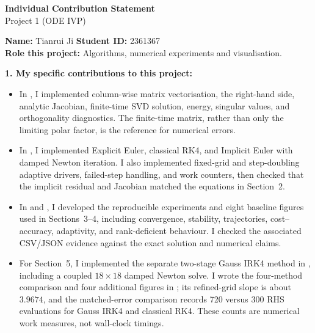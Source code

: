 \documentclass[11pt,a4paper]{article}
\begin{document}
\begin{center}
    {\Large\bfseries Individual Contribution Statement}\\[0.3em]
    {\large Project 1 (ODE IVP)}
\end{center}

\begin{formbox}
\small
\textbf{Name:} Tianrui Ji \hfill \textbf{Student ID:} 2361367\\
\textbf{Role this project:} Algorithms, numerical experiments and visualisation.

\textbf{1. My specific contributions to this project:}

\begin{itemize}[leftmargin=1.4em,itemsep=1pt,topsep=2pt]
    \item In , I implemented column-wise matrix
    vectorisation, the right-hand side, analytic Jacobian, finite-time SVD
    solution, energy, singular values, and orthogonality diagnostics. The
    finite-time matrix, rather than only the limiting polar factor, is the
    reference for numerical errors.
    \item In , I implemented Explicit Euler,
    classical RK4, and Implicit Euler with damped Newton iteration. I also
    implemented fixed-grid and step-doubling adaptive drivers, failed-step
    handling, and work counters, then checked that the implicit residual and
    Jacobian matched the equations in Section~2.
    \item In  and
    , I developed the reproducible experiments
    and eight baseline figures used in Sections~3--4, including convergence,
    stability, trajectories, cost--accuracy, adaptivity, and rank-deficient
    behaviour. I checked the associated CSV/JSON evidence against the exact
    solution and numerical claims.
    \item For Section~5, I implemented the separate two-stage Gauss IRK4
    method in , including a coupled
    $18\times18$ damped Newton solve. I wrote the four-method comparison and
    four additional figures in ; its
    refined-grid slope is about $3.9674$, and the matched-error comparison
    records 720 versus 300 RHS evaluations for Gauss IRK4 and classical RK4.
    These counts are numerical work measures, not wall-clock timings.
\end{itemize}


\end{formbox}
\end{document}
